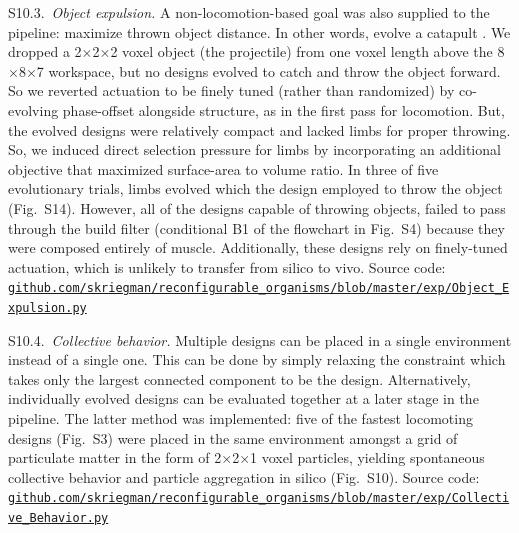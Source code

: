 S10.3.~\textit{Object expulsion.}
A non-locomotion-based goal was also supplied to the pipeline: maximize thrown object distance. In other words, evolve a catapult \cite{chaumont2007evolving}. 
We dropped a 2{$\times$}2{$\times$}2 voxel object (the projectile) from one voxel length above the 8{$\times$}8{$\times$}7 workspace, but no designs evolved to catch and throw the object forward. 
So we reverted actuation to be finely tuned (rather than randomized) by co-evolving phase-offset alongside structure, as in the first pass for locomotion. 
But, the evolved designs were relatively compact and lacked limbs for proper throwing. 
So, we induced direct selection pressure for limbs by incorporating an additional objective that maximized surface-area to volume ratio. 
In three of five evolutionary trials, limbs evolved which the design employed to throw the object (Fig.~S14). 
However, all of the designs capable of throwing objects, failed to pass through the build filter (conditional B1 of the flowchart in Fig.~S4) 
because they were composed entirely of muscle. 
Additionally, these designs rely on finely-tuned actuation, which is unlikely to transfer from silico to vivo. Source code: \\
\href{https://github.com/skriegman/reconfigurable_organisms/blob/master/exp/Object_Expulsion.py}{\scriptsize\tt\color{blue}github.com/skriegman/reconfigurable\_organisms/blob/master/exp/Object\_Expulsion.py}

\vspace{1em}

S10.4.~\textit{Collective behavior.}
Multiple designs can be placed in a single environment instead of a single one. 
This can be done by simply relaxing the constraint which takes only the largest connected component to be the design. 
Alternatively, individually evolved designs can be evaluated together at a later stage in the pipeline. 
The latter method was implemented: five of the fastest locomoting designs (Fig.~S3) were placed in the same environment amongst a grid of particulate matter in the form of 2{$\times$}2{$\times$}1 voxel particles, yielding spontaneous collective behavior and particle aggregation in silico (Fig.~S10). 
Source code: \\
\href{https://github.com/skriegman/reconfigurable_organisms/blob/master/exp/Collective_Behavior.py}{\scriptsize\tt\color{blue}github.com/skriegman/reconfigurable\_organisms/blob/master/exp/Collective\_Behavior.py}

\vspace{1em}


